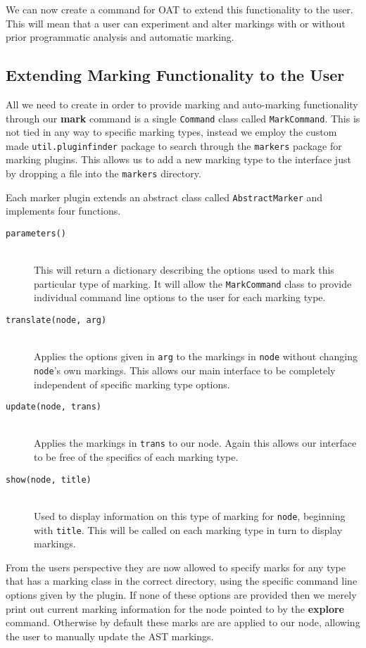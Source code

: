 \documentclass[twoside,a4paper]{report}
\begin{document}
We can now create a command for OAT to extend this functionality to the user. This will mean that a user can experiment and alter markings
with or without prior programmatic analysis and automatic marking.

\subsection{Extending Marking Functionality to the User}

All we need to create in order to provide marking and auto-marking functionality through our \textbf{mark} command is a single \texttt{Command}
class called \texttt{MarkCommand}. This is not tied in any way to specific marking types, instead we employ the custom made
\texttt{util.pluginfinder} package to search through the \texttt{markers} package for marking plugins. This allows us to add a new
marking type to the interface just by dropping a file into the \texttt{markers} directory.

Each marker plugin extends an abstract class called \texttt{AbstractMarker} and implements four functions.

\begin{description}
\item[\texttt{parameters()}] \hfill \\
This will return a dictionary describing the options used to mark this particular type of marking. It will allow the \texttt{MarkCommand}
class to provide individual command line options to the user for each marking type.
\item[\texttt{translate(node, arg)}] \hfill \\
Applies the options given in \texttt{arg} to the markings in \texttt{node} without changing \texttt{node}'s own markings. This allows
our main interface to be completely independent of specific marking type options.
\item[\texttt{update(node, trans)}] \hfill \\
Applies the markings in \texttt{trans} to our node. Again this allows our interface to be free of the specifics of each marking type.
\item[\texttt{show(node, title)}] \hfill \\
Used to display information on this type of marking for \texttt{node}, beginning with \texttt{title}. This will be called on each marking
type in turn to display markings.
\end{description}

From the users perspective they are now allowed to specify marks for any type that has a marking class in the correct directory, using the specific command
line options given by the plugin. If none of these options are provided then we merely print out current marking information for the node pointed to
by the \textbf{explore} command. Otherwise by default these marks are are applied to our node, allowing the user to manually update the AST
markings.
\end{document}
